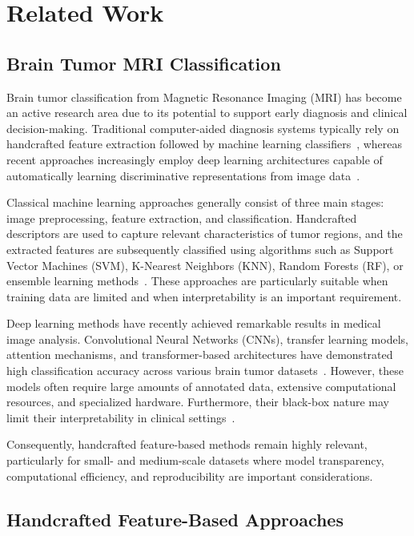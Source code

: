 \section{Related Work}
\label{sec:related}

\subsection{Brain Tumor MRI Classification}
\label{sec:rw_brain_tumor}

Brain tumor classification from Magnetic Resonance Imaging (MRI) has become an
active research area due to its potential to support early diagnosis and
clinical decision-making. Traditional computer-aided diagnosis systems
typically rely on handcrafted feature extraction followed by machine learning
classifiers~\cite{asiri2023,uvaneshwari2023}, whereas recent approaches
increasingly employ deep learning architectures capable of automatically
learning discriminative representations from image
data~\cite{ottoni2025,ghorbian2025}.

Classical machine learning approaches generally consist of three main stages:
image preprocessing, feature extraction, and classification. Handcrafted
descriptors are used to capture relevant characteristics of tumor regions, and
the extracted features are subsequently classified using algorithms such as
Support Vector Machines (SVM), K-Nearest Neighbors (KNN), Random Forests (RF),
or ensemble learning methods~\cite{kumar2024,boateng2020}. These approaches are
particularly suitable when training data are limited and when interpretability
is an important requirement.

Deep learning methods have recently achieved remarkable results in medical
image analysis. Convolutional Neural Networks (CNNs), transfer learning models,
attention mechanisms, and transformer-based architectures have demonstrated
high classification accuracy across various brain tumor
datasets~\cite{ghorbian2025,ottoni2025}. However, these models often require
large amounts of annotated data, extensive computational resources, and
specialized hardware. Furthermore, their black-box nature may limit their
interpretability in clinical settings~\cite{ottoni2025,ghorbian2025}.

Consequently, handcrafted feature-based methods remain highly relevant,
particularly for small- and medium-scale datasets where model transparency,
computational efficiency, and reproducibility are important considerations.

\subsection{Handcrafted Feature-Based Approaches}
\label{sec:rw_features}

